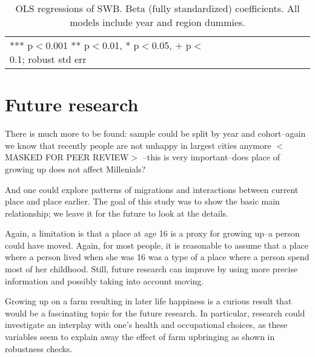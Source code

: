 \documentclass[10pt, letterpaper]{article}
\begin{document}
\begin{spacing}{2.0}
\begin{spacing}{.9}
  \begin{table}[H]\centering
    \caption{OLS regressions  of SWB. Beta (fully standardized) coefficients. All
      models include year and region dummies.} \label{regCDEF}
    \begin{scriptsize} \begin{tabular}{p{2.1in}p{.50in}p{.50in}p{.50in}p{.50in}p{.50in}p{.50in}p{.50in}p{.50in}p{.50in}p{.50 in}}\hline
        
        \hline *** p$<$0.001 ** p$<$0.01, * p$<$0.05, + p$<$0.1; robust std err
      \end{tabular}\end{scriptsize}\end{table}
\end{spacing}


\section*{Future research}

There is much more to be found: sample could be split by year and cohort--again we know that recently people
are not unhappy in largest cities anymore $<$MASKED FOR PEER REVIEW$>$%
--this is very
important--does place of growing up does not affect Millenials?

And one could explore patterns of migrations and interactions between current
place and place earlier. The goal of this study was to show the basic
main relationship; we leave it for the future to look at the details.

Again, a limitation is that a place at age 16 is a proxy for growing up--a person could have moved.
Again, for most people, it is reasonable to assume that a place where a person
lived when she was 16 was a type of a place where a person spend most of her
childhood. Still, future research can improve by using more precise information
and possibly taking into account moving.

Growing up on a farm resulting in later life happiness is a curious result that
would be a fascinating topic for the future research. In particular, research
could investigate an interplay with one's health and occupational choices, as
these variables seem to explain away the effect of farm upbringing as shown in
robustness checks. 


\end{spacing}
\end{document}
